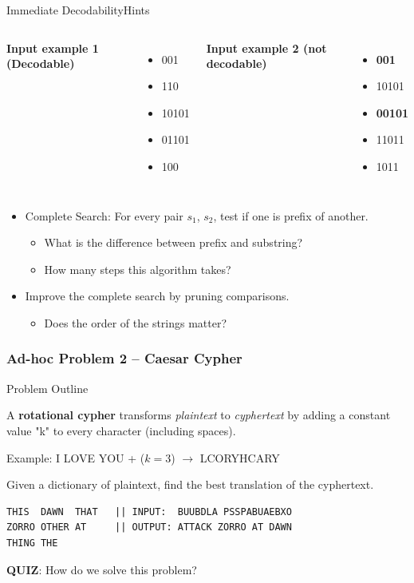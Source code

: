 \begin{frame}{Immediate Decodability}{Hints}
  \begin{columns}
    {\bf Input example 1 (Decodable)}
    \begin{itemize}
      \item 001
      \item 110
      \item 10101
      \item 01101
      \item 100
    \end{itemize}
    {\bf Input example 2 (not decodable)}
    \begin{itemize}
      \item {\bf 001}
      \item 10101
      \item {\bf 00101}
      \item 11011
      \item 1011
    \end{itemize}
  \end{columns}\bigskip

  \begin{itemize}
    \item Complete Search: For every pair $s_1$, $s_2$, test if one is prefix of another.
    \begin{itemize}
      \item What is the difference between prefix and substring?
      \item How many steps this algorithm takes?
    \end{itemize}
    \item Improve the complete search by pruning comparisons.
    \begin{itemize}
      \item Does the order of the strings matter?
    \end{itemize}
  \end{itemize}
\end{frame}


\begin{frame}[fragile]
  \frametitle{Ad-hoc Problem 2 -- Caesar Cypher}
    \begin{exampleblock}{Problem Outline}
      {\small A {\bf rotational cypher} transforms \emph{plaintext} to
      \emph{cyphertext} by adding a constant value "k" to every character  (including spaces).\medskip

      Example: I LOVE YOU + ($k = 3$) $\rightarrow$ LCORYHCARY\medskip

      Given a dictionary of plaintext, find the best translation of
      the cyphertext.}
    \end{exampleblock}

\begin{verbatim}
THIS  DAWN  THAT   || INPUT:  BUUBDLA PSSPABUAEBXO
ZORRO OTHER AT     || OUTPUT: ATTACK ZORRO AT DAWN
THING THE
\end{verbatim}
{\bf QUIZ}: How do we solve this problem?
\end{frame}

